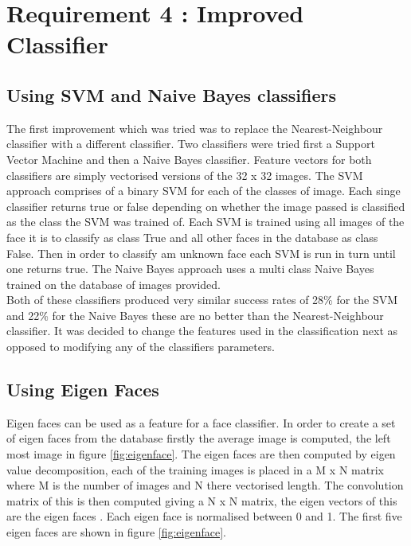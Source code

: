\documentclass{article}
\begin{document}
\section{Requirement 4 : Improved Classifier}

\subsection{Using SVM and Naive Bayes classifiers}

The first improvement which was tried was to replace the Nearest-Neighbour classifier
with a different classifier. Two classifiers were tried first a Support Vector Machine
and then a Naive Bayes classifier. Feature vectors for both classifiers are simply
vectorised versions of the 32 x 32 images. The SVM approach comprises of a binary SVM for
each of the classes of image. Each singe classifier returns true or false depending
on whether the image passed is classified as the class the SVM was trained of.
Each SVM is trained using all images of the face it is to classify as class True
and all other faces in the database as class False. Then in order to classify am
unknown face each SVM is run in turn until one returns true. The Naive Bayes approach
uses a multi class Naive Bayes trained on the database of images provided.\\

Both of these classifiers produced very similar success rates of 28\% for the SVM
and 22\% for the Naive Bayes these are no better than the Nearest-Neighbour classifier.
It was decided to change the features used in the classification next as opposed to
modifying any of the classifiers parameters.\\

\subsection{Using Eigen Faces}

Eigen faces can be used as a feature for a face classifier. In order to create a
set of eigen faces from the database firstly the average image is computed, the
left most image in figure \ref{fig:eigenface}. The eigen faces are then computed
by eigen value decomposition, each of the training images is placed in a M x N
matrix where M is the number of images and N there vectorised length. The convolution
matrix of this is then computed giving a N x N matrix, the eigen vectors of this
are the eigen faces \cite{eigface}. Each eigen face is normalised between 0 and 1. The first
five eigen faces are shown in figure \ref{fig:eigenface}.\\
\end{document}

